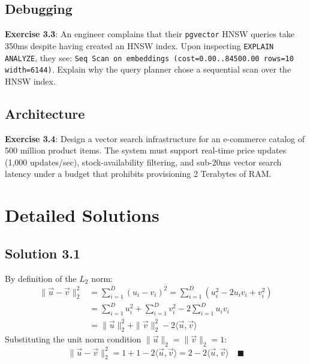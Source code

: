 \subsection*{Debugging}
\textbf{Exercise 3.3}: An engineer complains that their \texttt{pgvector} HNSW queries take 350ms despite having created an HNSW index. Upon inspecting \texttt{EXPLAIN ANALYZE}, they see:
\texttt{Seq Scan on embeddings (cost=0.00..84500.00 rows=10 width=6144)}. Explain why the query planner chose a sequential scan over the HNSW index.

\subsection*{Architecture}
\textbf{Exercise 3.4}: Design a vector search infrastructure for an e-commerce catalog of 500 million product items. The system must support real-time price updates (1,000 updates/sec), stock-availability filtering, and sub-20ms vector search latency under a budget that prohibits provisioning 2 Terabytes of RAM.

\section{Detailed Solutions}

\subsection*{Solution 3.1}
By definition of the $L_2$ norm:
\begin{align*}
\|\vec{u} - \vec{v}\|_2^2 &= \sum_{i=1}^D (u_i - v_i)^2 = \sum_{i=1}^D (u_i^2 - 2u_i v_i + v_i^2) \\
&= \sum_{i=1}^D u_i^2 + \sum_{i=1}^D v_i^2 - 2 \sum_{i=1}^D u_i v_i \\
&= \|\vec{u}\|_2^2 + \|\vec{v}\|_2^2 - 2\langle \vec{u}, \vec{v} \rangle
\end{align*}
Substituting the unit norm condition $\|\vec{u}\|_2 = \|\vec{v}\|_2 = 1$:
\[
\|\vec{u} - \vec{v}\|_2^2 = 1 + 1 - 2\langle \vec{u}, \vec{v} \rangle = 2 - 2\langle \vec{u}, \vec{v} \rangle \quad \blacksquare
\]

